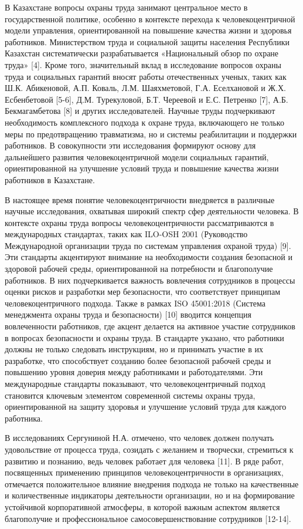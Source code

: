 \begin{multicols}{2}
В Казахстане вопросы охраны труда занимают центральное место в
государственной политике, особенно в контексте перехода к
человекоцентричной модели управления, ориентированной на повышение
качества жизни и здоровья работников. Министерством труда и социальной
защиты населения Республики Казахстан систематически разрабатывается
«Национальный обзор по охране труда» {[}4{]}. Кроме того, значительный
вклад в исследование вопросов охраны труда и социальных гарантий вносят
работы отечественных ученых, таких как Ш.К. Абикеновой, А.П. Коваль,
Л.М. Шаяхметовой, Г.А. Еселхановой и Ж.Х. Есбенбетовой {[}5-6{]}, Д.М.
Турекуловой, Б.Т. Череевой и Е.С. Петренко {[}7{]}, А.Б. Бекмагамбетова
{[}8{]} и других исследователей. Научные труды подчеркивают
необходимость комплексного подхода к охране труда, включающего не только
меры по предотвращению травматизма, но и системы реабилитации и
поддержки работников. В совокупности эти исследования формируют основу
для дальнейшего развития человекоцентричной модели социальных гарантий,
ориентированной на улучшение условий труда и повышение качества жизни
работников в Казахстане.

В настоящее время понятие человекоцентричности внедряется в различные
научные исследования, охватывая широкий спектр сфер деятельности
человека. В контексте охраны труда вопросы человекоцентричности
рассматриваются в международных стандартах, таких как ILO-OSH 2001
(Руководство Международной организации труда по системам управления
охраной труда) {[}9{]}. Эти стандарты акцентируют внимание на
необходимости создания безопасной и здоровой рабочей среды,
ориентированной на потребности и благополучие работников. В них
подчеркивается важность вовлечения сотрудников в процессы оценки рисков
и разработки мер безопасности, что соответствует принципам
человекоцентричного подхода. Также в рамках ISO 45001:2018 (Система
менеджмента охраны труда и безопасности) {[}10{]} вводится концепция
вовлеченности работников, где акцент делается на активное участие
сотрудников в вопросах безопасности и охраны труда. В стандарте указано,
что работники должны не только следовать инструкциям, но и принимать
участие в их разработке, что способствует созданию более безопасной
рабочей среды и повышению уровня доверия между работниками и
работодателями. Эти международные стандарты показывают, что
человекоцентричный подход становится ключевым элементом современной
системы охраны труда, ориентированной на защиту здоровья и улучшение
условий труда для каждого работника.

В исследованиях Сергуниной Н.А. отмечено, что человек должен получать
удовольствие от процесса труда, созидать с желанием и творчески,
стремиться к развитию и познанию, ведь человек работает для человека
{[}11{]}. В ряде работ, посвященных применению принципов
человекоцентричности в организациях, отмечается положительное влияние
внедрения подхода не только на качественные и количественные индикаторы
деятельности организации, но и на формирование устойчивой корпоративной
атмосферы, в которой важным аспектом является благополучие и
профессиональное самосовершенствование сотрудников {[}12-14{]}.


\end{multicols}

